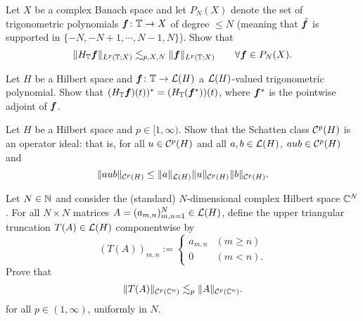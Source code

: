 \begin{exercise}\label{ex:HT-FD}
  Let $X$ be a complex Banach space and let $P_{N}(X)$ denote the set of trigonometric polynomials $\bm{f} \colon \mathbb{T} \rightarrow X$ of degree $\leq N$ (meaning that $\hat{\bm{f}}$ is supported in $\{-N,-N+1,\cdots,N-1,N\}$).
  Show that 
  \begin{equation*}
    \|H_{\mathbb{T}} \bm{f}\|_{L^p(\mathbb{T};X)} \lesssim_{p,X,N} \|\bm{f}\|_{L^p(\mathbb{T};X)} \qquad \forall \bm{f} \in P_{N}(X).
  \end{equation*}
\end{exercise}

\begin{exercise}\label{ex:HT-adjoint-Schatten}
  Let $H$ be a Hilbert space and  $\bm{f} \colon \mathbb{T} \to \mathcal{L}(H)$ a $\mathcal{L}(H)$-valued trigonometric polynomial.
  Show that $(H_{\mathbb{T}} \bm{f})(t))^* = (H_{\mathbb{T}} (\bm{f}^*))(t)$, where $\bm{f}^*$ is the pointwise adjoint of $\bm{f}$.
\end{exercise}

\begin{exercise}\label{ex:Schatten-ideal}
  Let $H$ be a Hilbert space and $p \in [1,\infty)$.
  Show that the Schatten class $\mathcal{C}^{p}(H)$ is an operator ideal: that is, for all $u \in \mathcal{C}^{p}(H)$ and all $a,b \in \mathcal{L}(H)$, $aub \in \mathcal{C}^{p}(H)$ and
  \begin{equation*}
    \|aub\|_{\mathcal{C}^{p}(H)} \leq \|a\|_{\mathcal{L}(H)} \|u\|_{\mathcal{C}^{p}(H)} \|b\|_{\mathcal{C}^{p}(H)}.
  \end{equation*}
\end{exercise}

\begin{exercise}
  Let $N \in \mathbb{N}$ and consider the (standard) $N$-dimensional complex Hilbert space $\mathbb{C}^N$.
  For all $N \times N$ matrices $A = (a_{m,n})_{m,n = 1}^{N} \in \mathcal{L}(H)$, define the upper triangular truncation $T(A) \in \mathcal{L}(H)$ componentwise by
  \begin{equation*}
    (T(A))_{m,n} := \begin{cases} a_{m,n} & (m \geq n) \\ 0 & (m < n). \end{cases}
  \end{equation*}
  Prove that
  \begin{equation*}
    \|T(A)\|_{\mathcal{C}^{p}(\mathbb{C}^{n})} \lesssim_{p} \|A\|_{\mathcal{C}^{p}(\mathbb{C}^{n})}.
  \end{equation*}
  for all $p \in (1,\infty)$, uniformly in $N$.
\end{exercise}


